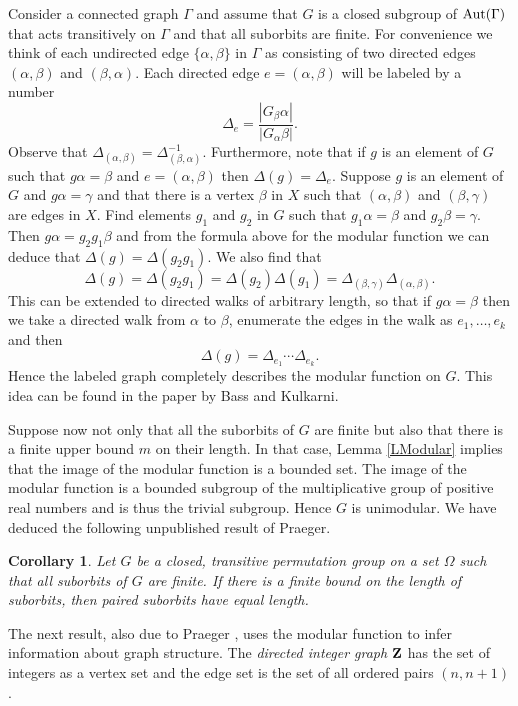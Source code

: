 \documentclass{emsprocart}
\newtheorem{corollary}[theorem]{Corollary}
\theoremstyle{definition}
\begin{document}
Consider a connected graph $\Gamma$ and assume that $G$ is a closed
subgroup of ${\mbox{${\rm Aut}(\Gamma)$}}$ that acts transitively on $\Gamma$ and that all
suborbits are finite.  For convenience we
think of each undirected
edge $\{\alpha,\beta\}$
in $\Gamma$ as consisting of two directed edges $(\alpha,\beta)$ and
$(\beta,\alpha)$.  Each directed edge $e=(\alpha,\beta)$
will be labeled by a number
$$\Delta_e=\frac{|G_\beta \alpha|}{|G_\alpha \beta|}.$$
Observe that $\Delta_{(\alpha,\beta)}=\Delta_{(\beta,\alpha)}^{-1}$.
Furthermore, note that if $g$ is an element of $G$
such that $g\alpha=\beta$ and $e=(\alpha, \beta)$ then
$\Delta(g)=\Delta_e$.  Suppose $g$ is an element of $G$
and $g\alpha=\gamma$ and
that there is a vertex
$\beta$ in $X$ such that $(\alpha,\beta)$  and $(\beta,\gamma)$ are
edges in $X$.  Find elements $g_1$ and $g_2$ in $G$ such that
$g_1\alpha=\beta$ and $g_2\beta=\gamma$.
Then $g\alpha=g_2g_1\beta$ and from the
formula above for the modular function we can deduce that
$\Delta(g)=\Delta(g_2g_1)$.  We also find that
$$\Delta(g)=\Delta(g_2g_1)=\Delta(g_2)\Delta(g_1)=\Delta_{(\beta,\gamma)}
\Delta_{(\alpha,\beta)}.$$
This can be extended to directed walks
of arbitrary length, so that if $g\alpha=\beta$
then we take a directed walk from $\alpha$ to $\beta$, enumerate the edges in
the walk as $e_1, \ldots, e_k$ and then
$$\Delta(g)=\Delta_{e_1}\cdots \Delta_{e_k}.$$
Hence the labeled graph completely describes the modular function on
$G$. This idea can be found in the paper \cite{BassKulkarni1990} by Bass and Kulkarni.

\bigskip
Suppose now not only that all the suborbits of $G$ are finite
but also that there is a finite upper
bound $m$ on their length.
In that case, Lemma \ref{LModular} implies that the image of the modular
function is a bounded set.  The image of the modular function is a bounded subgroup
of the multiplicative group of positive
real numbers and is thus the trivial subgroup.  Hence $G$ is unimodular.
We have deduced the following unpublished result of Praeger.

\begin{corollary}
Let $G$ be a closed, transitive permutation
group on a set $\Omega$ such that
all suborbits of $G$ are finite.
If there is a finite bound on the length of suborbits, then paired suborbits
have equal length.
\end{corollary}

The next result, also due to Praeger \cite{Praeger1991},
uses the modular function to infer information about graph structure.
The {\em directed integer graph}
${\mbox{\bf Z}}$ has  the set of integers as a vertex set and the edge set is the set of
all ordered pairs $(n, n+1)$.
\end{document}
